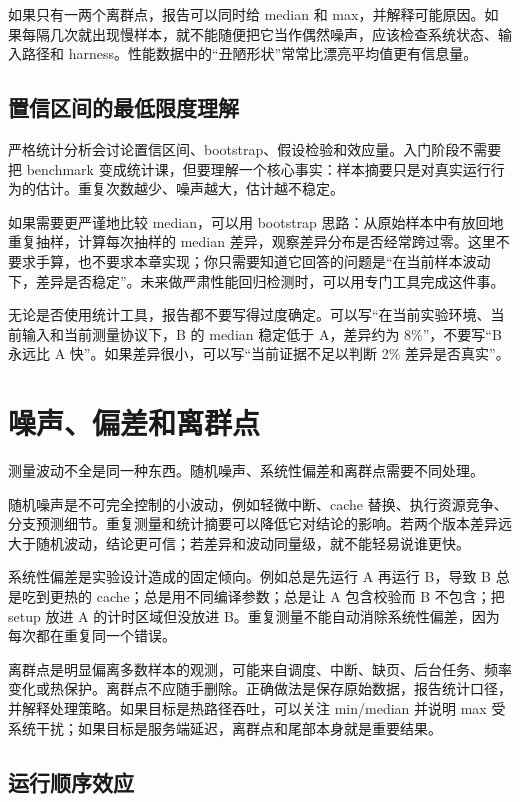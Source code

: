 如果只有一两个离群点，报告可以同时给 median 和 max，并解释可能原因。如果每隔几次就出现慢样本，就不能随便把它当作偶然噪声，应该检查系统状态、输入路径和 harness。性能数据中的“丑陋形状”常常比漂亮平均值更有信息量。

\subsection{置信区间的最低限度理解}

严格统计分析会讨论置信区间、bootstrap、假设检验和效应量。入门阶段不需要把 benchmark 变成统计课，但要理解一个核心事实：样本摘要只是对真实运行行为的估计。重复次数越少、噪声越大，估计越不稳定。

如果需要更严谨地比较 median，可以用 bootstrap 思路：从原始样本中有放回地重复抽样，计算每次抽样的 median 差异，观察差异分布是否经常跨过零。这里不要求手算，也不要求本章实现；你只需要知道它回答的问题是“在当前样本波动下，差异是否稳定”。未来做严肃性能回归检测时，可以用专门工具完成这件事。

无论是否使用统计工具，报告都不要写得过度确定。可以写“在当前实验环境、当前输入和当前测量协议下，B 的 median 稳定低于 A，差异约为 8\%”，不要写“B 永远比 A 快”。如果差异很小，可以写“当前证据不足以判断 2\% 差异是否真实”。

\section{噪声、偏差和离群点}

测量波动不全是同一种东西。随机噪声、系统性偏差和离群点需要不同处理。

随机噪声是不可完全控制的小波动，例如轻微中断、cache 替换、执行资源竞争、分支预测细节。重复测量和统计摘要可以降低它对结论的影响。若两个版本差异远大于随机波动，结论更可信；若差异和波动同量级，就不能轻易说谁更快。

系统性偏差是实验设计造成的固定倾向。例如总是先运行 A 再运行 B，导致 B 总是吃到更热的 cache；总是用不同编译参数；总是让 A 包含校验而 B 不包含；把 setup 放进 A 的计时区域但没放进 B。重复测量不能自动消除系统性偏差，因为每次都在重复同一个错误。

离群点是明显偏离多数样本的观测，可能来自调度、中断、缺页、后台任务、频率变化或热保护。离群点不应随手删除。正确做法是保存原始数据，报告统计口径，并解释处理策略。如果目标是热路径吞吐，可以关注 min/median 并说明 max 受系统干扰；如果目标是服务端延迟，离群点和尾部本身就是重要结果。

\subsection{运行顺序效应}

